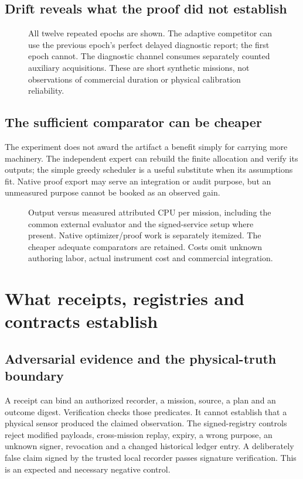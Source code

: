 \subsection{Drift reveals what the proof did not establish}
\DriftResults

\begin{figure}[H]\centering
\resizebox{\textwidth}{!}{}
\caption{All twelve repeated epochs are shown. The adaptive competitor can use the previous epoch's perfect delayed diagnostic report; the first epoch cannot. The diagnostic channel consumes separately counted auxiliary acquisitions. These are short synthetic missions, not observations of commercial duration or physical calibration reliability.}
\end{figure}

\subsection{The sufficient comparator can be cheaper}
\ComputeResults
The experiment does not award the artifact a benefit simply for carrying more machinery. The independent expert can rebuild the finite allocation and verify its outputs; the simple greedy scheduler is a useful substitute when its assumptions fit. Native proof export may serve an integration or audit purpose, but an unmeasured purpose cannot be booked as an observed gain.

\begin{figure}[H]\centering
\resizebox{\textwidth}{!}{}
\caption{Output versus measured attributed CPU per mission, including the common external evaluator and the signed-service setup where present. Native optimizer/proof work is separately itemized. The cheaper adequate comparators are retained. Costs omit unknown authoring labor, actual instrument cost and commercial integration.}
\end{figure}

\section{What receipts, registries and contracts establish}
\subsection{Adversarial evidence and the physical-truth boundary}
A receipt can bind an authorized recorder, a mission, source, a plan and an outcome digest. Verification checks those predicates. It cannot establish that a physical sensor produced the claimed observation. The signed-registry controls reject modified payloads, cross-mission replay, expiry, a wrong purpose, an unknown signer, revocation and a changed historical ledger entry. A deliberately false claim signed by the trusted local recorder passes signature verification. This is an expected and necessary negative control.

